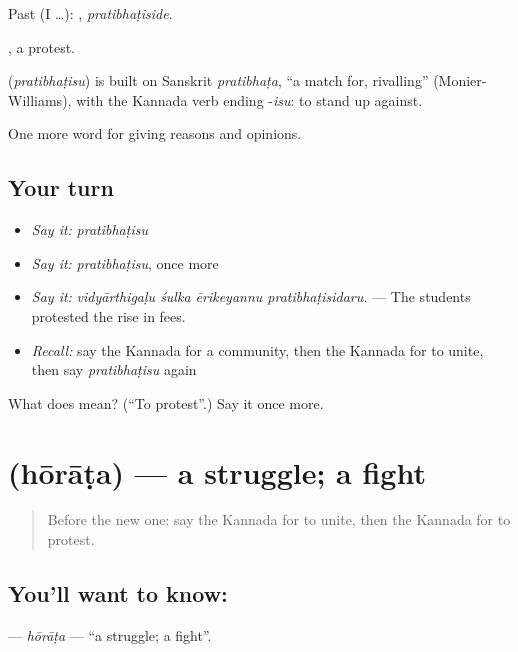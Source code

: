 Past (I …): , \emph{pratibhaṭiside}.

, a protest.

\begin{cousinweb}
\textbf{} (\emph{pratibhaṭisu}) is built on Sanskrit \emph{pratibhaṭa}, \textquotedblleft{}a match for, rivalling\textquotedblright{} (Monier-Williams), with the Kannada verb ending -\emph{isu}: to stand up against.
\end{cousinweb}

\begin{grammarlens}[title={What you've built}]
One more word for giving reasons and opinions.
\end{grammarlens}

\subsection*{Your turn}
\begin{itemize}
\raggedright
  \item \emph{Say it:} \emph{pratibhaṭisu}
  \item \emph{Say it:} \emph{pratibhaṭisu}, once more
  \item \emph{Say it:} \emph{vidyārthigaḷu śulka ērikeyannu pratibhaṭisidaru.} — The students protested the rise in fees.
  \item \emph{Recall:} say the Kannada for a community, then the Kannada for to unite, then say \emph{pratibhaṭisu} again
\end{itemize}

\begin{tcolorbox}[breakable,colback=teal!4,colframe=teal!35!black,title={Before you move on}]
What does  mean? (\textquotedblleft{}To protest\textquotedblright{}.) Say it once more.
\end{tcolorbox}
\section[\texorpdfstring{\kn{ಹೋರಾಟ} (hōrāṭa)}{ಹೋರಾಟ (hōrāṭa)}]{ (hōrāṭa) — a struggle; a fight}

\label{lesson:KA-C398-horata}



\begin{quote}
Before the new one: say the Kannada for to unite, then the Kannada for to protest.
\end{quote}

\subsection*{You'll want to know: }
\textbf{} — \emph{hōrāṭa} — \textquotedblleft{}a struggle; a fight\textquotedblright{}.

